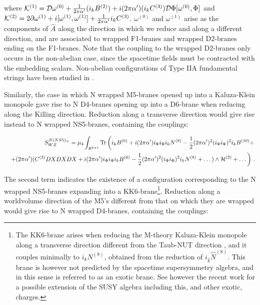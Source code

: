 \documentclass[12pt,a4paper]{article}
\begin{document}
\noindent where ${\cal K}^{(1)}={\cal D}\omega^{(0)}+
\frac{1}{2\pi\alpha^\prime}(i_k B^{(2)})+i(2\pi\alpha^\prime)
(i_k C^{(3)}){\cal D}\Phi [\omega^{(0)},\Phi]$ and
${\cal K}^{(2)}=2\partial\omega^{(1)}+i[\omega^{(1)},\omega^{(1)}]
+\frac{1}{2\pi\alpha^\prime}i_k C^{(3)}$. $\omega^{(0)}$ and
$\omega^{(1)}$ arise as the components of ${\hat A}$ along the direction
in which we reduce and along a different direction, and are
associated to wrapped F1-branes and wrapped D2-branes ending on the
F1-branes. Note that the coupling to the wrapped D2-branes only
occurs in the non-abelian case, since the spacetime fields must be
contracted with the embedding scalars. Non-abelian configurations of
Type IIA fundamental strings have been studied in \cite{ES}.

Similarly, the case in which N wrapped M5-branes opened up 
into a Kaluza-Klein monopole gave rise to N D4-branes opening up into 
a D6-brane when reducing along the Killing direction. Reduction
along a transverse
direction would give rise instead to N wrapped NS5-branes, 
containing the couplings:

\begin{eqnarray}
\label{actionNS5}
&&S^{N (NS5)_w}_{WZ}=\mu_4\int_{R^{4+1}}{\rm Tr}\left(i_k B^{(6)}+
i(2\pi\alpha^\prime)i_\Phi i_\Phi i_k N^{(8)}-\frac12
(2\pi\alpha^\prime)^2 (i_\Phi i_\Phi)^2 i_k B^{(10)}+\right.
\nonumber\\
&&\left. +(2\pi\alpha^\prime)(C^{(3)}DXDXDX+i(2\pi\alpha^\prime)
i_\Phi i_\Phi i_k B^{(6)}-\frac12 (2\pi\alpha^\prime)^2
(i_\Phi i_\Phi)^2 i_k N^{(8)}+\dots)\wedge {\cal H}^{(2)}+\dots\right)\, .
\nonumber\\
\end{eqnarray}

\noindent The second term indicates the existence of a configuration 
corresponding to the N wrapped NS5-branes expanding into a 
KK6-brane\footnote{The KK6-brane arises when reducing the M-theory
Kaluza-Klein monopole along a transverse direction different from
the Taub-NUT direction \cite{EB,HMO}, and it couples minimally
to $i_k N^{(8)}$, obtained from the reduction of 
$i_{\hat k}{\hat N}^{(8)}$. This brane is
however not predicted by the spacetime supersymmetry algebra, and 
in this sense is referred to as an exotic brane. See however the
recent work \cite{LO} for a possible extension of the SUSY algebra
including this, and other exotic, charges.}. 
Reduction along a worldvolume direction of the M5's different from 
that on which they are wrapped would give rise to
N wrapped D4-branes, containing the couplings:
\end{document}

